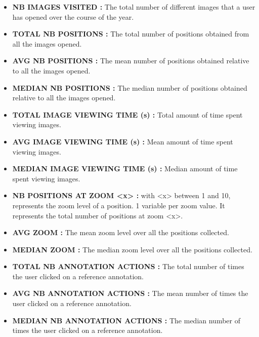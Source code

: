 \documentclass[a4paper,11pt]{report}
\numberwithin{figure}{section} %
\begin{document}
   \begin{itemize}
    \item[\textbullet] \textbf{NB IMAGES VISITED :} The total number of different images that a user has opened over the course of the year.\\
    \item[\textbullet] \textbf{TOTAL NB POSITIONS :} The total number of positions obtained from all the images opened.\\
    \item[\textbullet] \textbf{AVG NB POSITIONS :} The mean number of positions obtained relative to all the images opened.\\
    
    \item[\textbullet] \textbf{MEDIAN NB POSITIONS :} The median number of positions  obtained relative to all the images opened.\\
    \item[\textbullet] \textbf{TOTAL IMAGE VIEWING TIME (s) :} Total amount of time spent viewing images.\\

    \item[\textbullet] \textbf{AVG IMAGE VIEWING TIME (s) :} Mean amount of time spent viewing images.\\

    \item[\textbullet] \textbf{MEDIAN IMAGE VIEWING TIME (s) :} Median amount of time spent viewing images.\\

    \item[\textbullet] \textbf{NB POSITIONS AT ZOOM <x> :} with <x> between 1 and 10, represents the zoom level of a position.
    1 variable per zoom value.
    It represents the total number of positions at zoom <x>.\\
    \item[\textbullet] \textbf{AVG ZOOM :} The mean zoom level over all the positions collected.\\
    \item[\textbullet] \textbf{MEDIAN ZOOM :} The median zoom level over all the positions collected.\\
    \item[\textbullet] \textbf{TOTAL NB ANNOTATION ACTIONS :} The total number of times the user clicked on a reference annotation.\\
    \item[\textbullet] \textbf{AVG NB ANNOTATION ACTIONS :} The mean number of times the user clicked on a reference annotation.\\
    \item[\textbullet] \textbf{MEDIAN NB ANNOTATION ACTIONS :} The median number of times the user clicked on a reference annotation.\\
    

\end{itemize}
\end{document}
